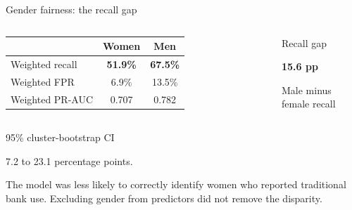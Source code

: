 \documentclass[aspectratio=169,10pt]{beamer}
\begin{document}

\begin{frame}{Gender fairness: the recall gap}

\begin{columns}[T,onlytextwidth]


\begin{table}

\centering

\begin{tabular}{lcc}

\toprule

&
\textbf{Women}
&
\textbf{Men}
\\

\midrule

Weighted recall
&
\textbf{51.9\%}
&
\textbf{67.5\%}
\\

Weighted FPR
&
6.9\%
&
13.5\%
\\

Weighted PR-AUC
&
0.707
&
0.782
\\

\bottomrule

\end{tabular}

\end{table}


\begin{block}{Recall gap}

\centering

{\LARGE\color{StrathRed}\bfseries 15.6 pp}

\vspace{.1cm}

Male minus female recall

\end{block}

\end{columns}

\begin{alertblock}{95\% cluster-bootstrap CI}

7.2 to 23.1 percentage points.

\end{alertblock}

The model was less likely to correctly identify women who reported traditional bank use. Excluding gender from predictors did not remove the disparity.

\end{frame}
\end{document}
